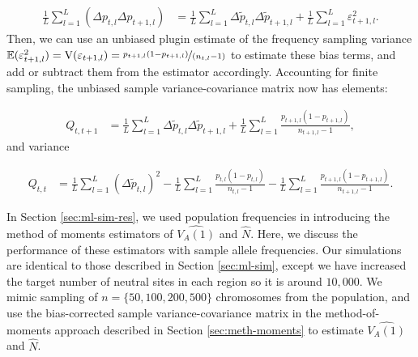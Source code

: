 \documentclass[11pt]{article}
\newcommand{\E}{\mathbb{E}}
\newcommand{\V}{\text{V}}
\begin{document}
\begin{align}
  \frac{1}{L} \sum_{l=1}^L \left(\Delta p_{t,l} \Delta p_{t+1,l} \right)  &=
  \frac{1}{L} \sum_{l=1}^L \Delta \widetilde{p}_{t,l} \Delta \widetilde{p}_{t+1,l}
  + \frac{1}{L} \sum_{l=1}^L \varepsilon_{t+1,l}^2.
\end{align}
%
Then, we can use an unbiased plugin estimate of the frequency sampling variance
$\E(\varepsilon_{t+1,l}^2) = \V(\varepsilon_{t+1,l}) =
\nicefrac{p_{t+1,l}(1-p_{t+1,l})}{(n_{t,l}-1)}$ \parencite[p. 191]{Nei1987-bx}
to estimate these bias terms, and add or subtract them from the estimator
accordingly. Accounting for finite sampling, the unbiased sample
variance-covariance matrix now has elements:

\begin{align}
  \label{eq:corrected-var}
  Q_{t,t+1} &=
  \frac{1}{L} \sum_{l=1}^L \Delta \widetilde{p}_{t,l} \Delta \widetilde{p}_{t+1,l}
  + \frac{1}{L} \sum_{l=1}^L \frac{p_{t+1,l}(1-p_{t+1,l})}{n_{t+1,l} - 1},
\end{align}
and variance

\begin{align}
  \label{eq:corrected-cov}
  Q_{t,t} &=
  \frac{1}{L} \sum_{l=1}^L (\Delta \widetilde{p}_{t,l})^2
  - \frac{1}{L} \sum_{l=1}^L \frac{p_{t,l}(1-p_{t,l})}{n_{t,l} - 1}
  - \frac{1}{L} \sum_{l=1}^L \frac{p_{t+1,l}(1-p_{t+1,l})}{n_{t+1,l} - 1}.
\end{align}

In Section \ref{sec:ml-sim-res}, we used population frequencies in
introducing the method of moments estimators of $\widehat{V_A(1)}$ and
$\widehat{N}$. Here, we discuss the performance of these estimators with sample
allele frequencies. Our simulations are identical to those described in Section
\ref{sec:ml-sim}, except we have increased the target number of neutral sites
in each region so it is around $10,000$. We mimic sampling of $n=\{50, 100,
200, 500\}$ chromosomes from the population, and use the bias-corrected
sample variance-covariance matrix in the method-of-moments approach described
in Section \ref{sec:meth-moments} to estimate $\widehat{V_A(1)}$ and
$\widehat{N}$.
\end{document}
